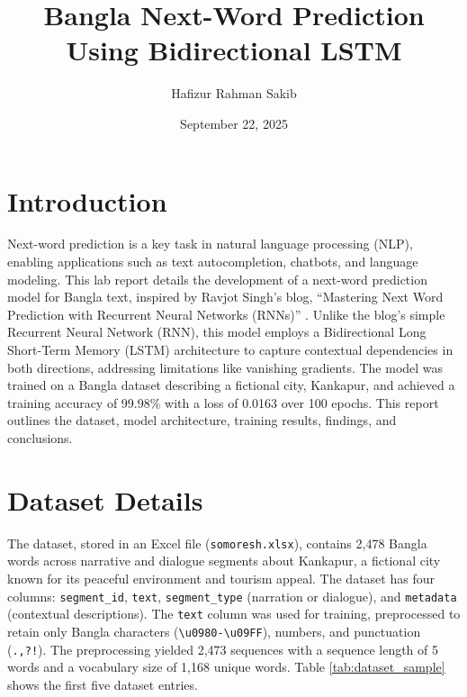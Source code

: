 \documentclass[12pt]{article}
\title{Bangla Next-Word Prediction Using Bidirectional LSTM}
\author{Hafizur Rahman Sakib}
\date{September 22, 2025}
\begin{document}
\maketitle

\section{Introduction}
Next-word prediction is a key task in natural language processing (NLP), enabling applications such as text autocompletion, chatbots, and language modeling. This lab report details the development of a next-word prediction model for Bangla text, inspired by Ravjot Singh's blog, ``Mastering Next Word Prediction with Recurrent Neural Networks (RNNs)'' \cite{singh2024}. Unlike the blog's simple Recurrent Neural Network (RNN), this model employs a Bidirectional Long Short-Term Memory (LSTM) architecture to capture contextual dependencies in both directions, addressing limitations like vanishing gradients. The model was trained on a Bangla dataset describing a fictional city, Kankapur, and achieved a training accuracy of 99.98\% with a loss of 0.0163 over 100 epochs. This report outlines the dataset, model architecture, training results, findings, and conclusions.

\section{Dataset Details}
The dataset, stored in an Excel file (\texttt{somoresh.xlsx}), contains 2,478 Bangla words across narrative and dialogue segments about Kankapur, a fictional city known for its peaceful environment and tourism appeal. The dataset has four columns: \texttt{segment\_id}, \texttt{text}, \texttt{segment\_type} (narration or dialogue), and \texttt{metadata} (contextual descriptions). The \texttt{text} column was used for training, preprocessed to retain only Bangla characters (\texttt{\textbackslash u0980-\textbackslash u09FF}), numbers, and punctuation (\texttt{.,?!}). The preprocessing yielded 2,473 sequences with a sequence length of 5 words and a vocabulary size of 1,168 unique words. Table \ref{tab:dataset_sample} shows the first five dataset entries.
\end{document}

